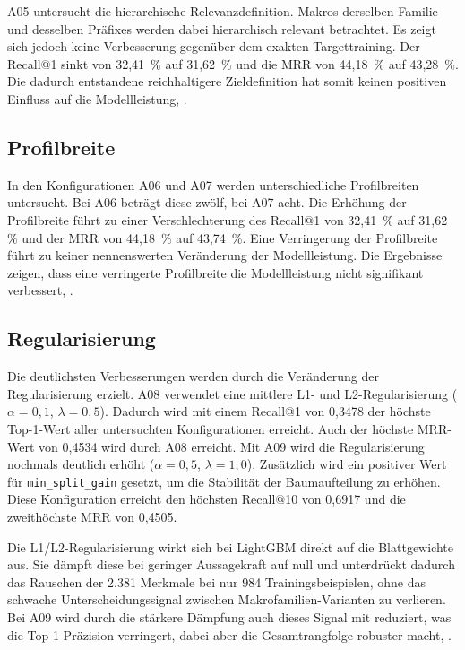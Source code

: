 A05 untersucht die hierarchische Relevanzdefinition. Makros \parencite{EPLAN-Makros} derselben Familie und desselben Präfixes werden dabei hierarchisch relevant betrachtet.
Es zeigt sich jedoch keine Verbesserung gegenüber dem exakten Targettraining. Der Recall@1 sinkt von 32,41 \,\% auf 31,62 \,\% und die MRR von 44,18 \,\% auf 43,28 \,\%.
Die dadurch entstandene reichhaltigere Zieldefinition hat somit keinen positiven Einfluss auf die Modellleistung, \parencite{LTR_Configuration_Test_Series}.

\subsection{Profilbreite}

In den Konfigurationen A06 und A07 werden unterschiedliche Profilbreiten untersucht. Bei A06 beträgt diese zwölf, bei A07 acht.
Die Erhöhung der Profilbreite führt zu einer Verschlechterung des Recall@1 von 32,41 \,\% auf 31,62 \,\% und der MRR von 44,18 \,\% auf 43,74 \,\%.
Eine Verringerung der Profilbreite führt zu keiner nennenswerten Veränderung der Modellleistung. 
Die Ergebnisse zeigen, dass eine verringerte Profilbreite die Modellleistung nicht signifikant verbessert, \parencite{LTR_Configuration_Test_Series}.

\subsection{Regularisierung}

Die deutlichsten Verbesserungen werden durch die Veränderung der Regularisierung erzielt.
A08 verwendet eine mittlere L1- und L2-Regularisierung (\(\alpha = 0{,}1\), \(\lambda = 0{,}5\)). 
Dadurch wird mit einem Recall@1 von 0,3478 der höchste Top-1-Wert aller untersuchten Konfigurationen erreicht. Auch der höchste MRR-Wert von 0,4534 wird durch A08 erreicht.
Mit A09 wird die Regularisierung nochmals deutlich erhöht (\(\alpha = 0{,}5\), \(\lambda = 1{,}0\)). Zusätzlich wird ein positiver Wert für \texttt{min\_split\_gain} gesetzt, um die Stabilität der Baumaufteilung zu erhöhen. 
Diese Konfiguration erreicht den höchsten Recall@10 von 0,6917 und die zweithöchste MRR von 0,4505.

Die L1/L2-Regularisierung wirkt sich bei LightGBM direkt auf die Blattgewichte aus.
Sie dämpft diese bei geringer Aussagekraft auf null und unterdrückt dadurch das Rauschen der 2.381 Merkmale bei nur 984 Trainingsbeispielen, ohne das schwache Unterscheidungssignal zwischen Makrofamilien-Varianten zu verlieren.
Bei A09 wird durch die stärkere Dämpfung auch dieses Signal mit reduziert, was die Top-1-Präzision verringert, dabei aber die Gesamtrangfolge robuster macht, \parencite{LTR_Configuration_Test_Series}.


